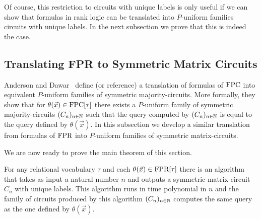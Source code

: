 \documentclass[../paper.tex]{subfiles}
\begin{document}
Of course, this restriction to circuits with unique labels is only useful if we
can show that formulas in rank logic can be translated into $P$-uniform families
circuits with unique labels. In the next subsection we prove that this is indeed
the case.

\subsection{Translating FPR to Symmetric Matrix Circuits}
Anderson and Dawar~\cite{} define (or reference) a translation of formulas of
$\text{\upshape FPC}$ into equivalent $P$-uniform families of symmetric majority-circuits. More
formally, they show that for $\theta(\vec{x}) \in \text{\upshape FPC}[\tau]$ there exists a
$P$-uniform family of symmetric majority-circuits $(C_n)_{n \in \mathbb{N}}$ such
that the query computed by $(C_n)_{n \in \mathbb{N}}$ is equal to the query defined
by $\theta (\vec{x})$. In this subsection we develop a similar translation from
formulas of $\text{\upshape FPR}$ into $P$-uniform families of symmetric matrix-circuits.


We are now ready to prove the main theorem of this section.

\begin{thm}
  For any relational vocabulary $\tau$ and each $\theta(\vec{x}) \in \text{\upshape FPR}[\tau]$
  there is an algorithm that takes as input a natural number $n$ and outputs a
  symmetric matrix-circuit $C_n$ with unique labels. This algorithm runs in time
  polynomial in $n$ and the family of circuits produced by this algorithm
  $(C_n)_{n \in \mathbb{N}}$ computes the same query as the one defined by
  $\theta(\vec{x})$.
\end{thm}
\end{document}
